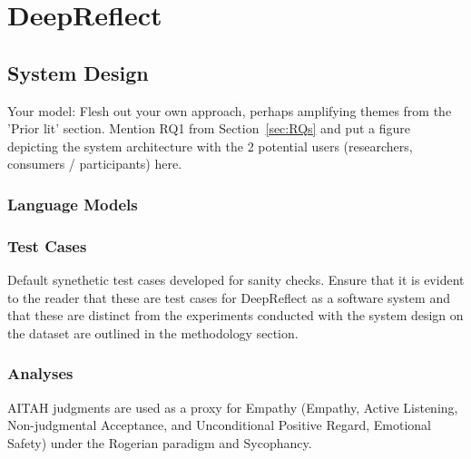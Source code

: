 
\section{DeepReflect}\label{sec:deepreflect}

\subsection{System Design}
\textcolor{black!40}{Your model: Flesh out your own approach, perhaps amplifying themes from the 'Prior lit' section. Mention RQ1 from Section~\ref{sec:RQs} and put a figure depicting the system architecture with the 2 potential users (researchers, consumers / participants) here.}
\subsubsection{Language Models}
\textcolor{black!30}{\lipsum[8-8]}
\subsubsection{Test Cases}
\textcolor{black!40}{Default synethetic test cases developed for sanity checks.}
\textcolor{black!40}{Ensure that it is evident to the reader that these are test cases for DeepReflect as a software system and that these are distinct from the experiments conducted with the system design on the dataset are outlined in the methodology section.}
\textcolor{black!30}{\lipsum[9-9]}

\subsubsection{Analyses}
\textcolor{black!30}{AITAH judgments are used as a proxy for Empathy (Empathy, Active Listening, Non-judgmental Acceptance, and Unconditional Positive Regard, Emotional Safety) under the Rogerian paradigm and Sycophancy.}
\textcolor{black!30}{\lipsum[10-10]}

